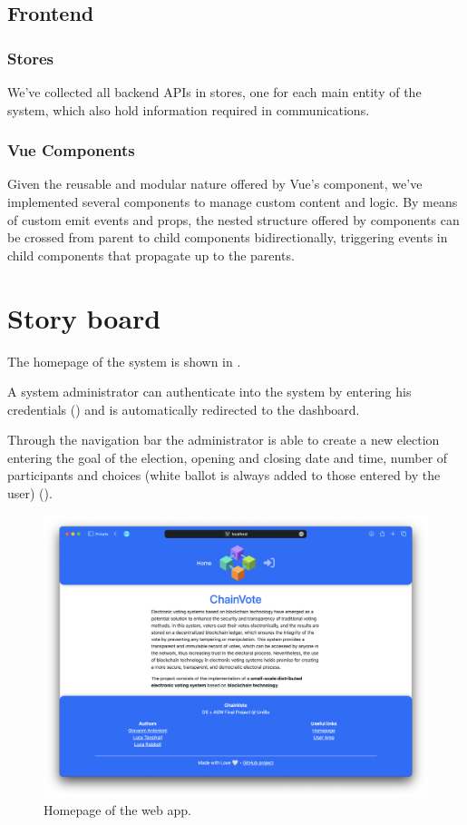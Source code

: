 \documentclass{scrartcl}
\begin{document}


\subsection{Frontend}

\subsubsection{Stores}

We've collected all backend APIs in stores, one for each main entity of the system, which also hold information required in communications.

\subsubsection{Vue Components}

Given the reusable and modular nature offered by Vue's component, we've implemented several components to manage custom content and logic.
By means of custom emit events and props, the nested structure offered by components can be crossed from parent to child components bidirectionally, triggering events in child components that propagate up to the parents.

\section{Story board}

The homepage of the system is shown in .

A system administrator can authenticate into the system by entering his credentials () and is automatically redirected to the dashboard.

Through the navigation bar the administrator is able to create a new election entering the goal of the election, opening and closing date and time, number of participants and choices (white ballot is always added to those entered by the user) ().

\begin{figure}
    \centering
    \includegraphics[width=0.9\linewidth]{figures/story-board/1-index.png}
    \caption{Homepage of the web app.}
    \label{fig:homepage}
\end{figure}
\end{document}
